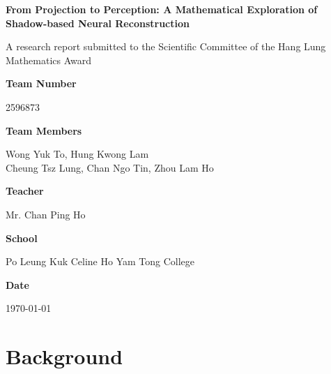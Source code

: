 \documentclass[12pt]{article}
\begin{document}
\begin{titlepage}
    \centering
    \vspace*{1cm}
    {\huge \textbf{From Projection to Perception: A Mathematical Exploration of Shadow-based Neural Reconstruction}\par}
    \vspace{1.5cm}
    {\normalsize
    A research report submitted to the Scientific Committee of the Hang Lung Mathematics Award\par}
    \vspace{1cm}
    {\normalsize \textbf{Team Number}\par 2596873\par}
    \vspace{0.5cm}
    {\normalsize \textbf{Team Members}\par Wong Yuk To, Hung Kwong Lam \\ Cheung Tsz Lung, Chan Ngo Tin, Zhou Lam Ho\par}
    \vspace{0.5cm}
    {\normalsize \textbf{Teacher}\par Mr. Chan Ping Ho\par}
    \vspace{0.5cm}
    {\normalsize \textbf{School}\par Po Leung Kuk Celine Ho Yam Tong College\par}
    \vspace{0.5cm}
    {\normalsize \textbf{Date}\par \today\par}
    \vspace{2cm}

\begin{abstract}
\raggedright %
This paper explores ShadowNeuS [LWX23], a neural network that reconstructs 3D geometry from single-view camera images using shadow and light cues. Unlike traditional 3D reconstruction methods relying on multi-view cameras or sensors, ShadowNeuS leverages a neural signed distance field (SDF) for accurate 3D geometry reconstruction. Analysis of the training process reveals deep connections to projective geometry, spatial reasoning in $\mathbb{R}^3$, and the network's perception of three-dimensional space.
\end{abstract}

\end{titlepage}
\tableofcontents

\newpage
\section{Background}
\end{document}
